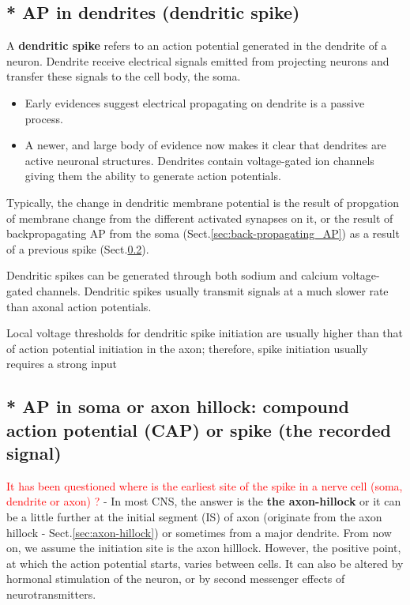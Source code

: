\subsection{* AP in dendrites (dendritic spike)}
\label{sec:dendritic-spike}

A {\bf dendritic spike} refers to an action potential generated in the dendrite
of a neuron. Dendrite  receive electrical signals emitted from projecting
neurons and transfer these signals to the cell body, the soma.
\begin{itemize}
  \item Early evidences suggest electrical propagating on dendrite is a passive
  process.
  
  \item A newer, and large body of evidence now makes it clear that dendrites
  are active neuronal structures. Dendrites contain voltage-gated ion channels
  giving them the ability to generate action potentials.
\end{itemize}
Typically, the change in dendritic membrane potential is the result of
propgation of membrane change from the different activated synapses on it, or
the result of backpropagating AP from the soma (Sect.\ref{sec:back-propagating_AP}) as a
result of a previous spike (Sect.\ref{sec:spike}).

Dendritic spikes can be generated through both sodium and calcium voltage-gated
channels. Dendritic spikes usually transmit signals at a much slower rate than
axonal action potentials.

Local voltage thresholds for dendritic spike initiation are usually higher than
that of action potential initiation in the axon; therefore, spike initiation usually requires a strong input




\subsection{* AP in soma or axon hillock: compound action potential (CAP) or
spike (the recorded signal)}
\label{sec:spike}
\label{sec:AP-neuron-soma}

\textcolor{red}{It has been questioned where is the earliest site of the spike
in a nerve cell (soma, dendrite or axon) ?} - In most CNS, the answer is the
{\bf the axon-hillock} or it can be a little further at the initial segment (IS)
of axon (originate from the axon hillock - Sect.\ref{sec:axon-hillock})
\citep{stuart1997} or sometimes from a major dendrite.
From now on, we assume the initiation site is the axon hilllock.
However, the positive point, at which the action potential starts, varies
between cells. It can also be altered by hormonal stimulation of the neuron, or
by second messenger effects of neurotransmitters.

